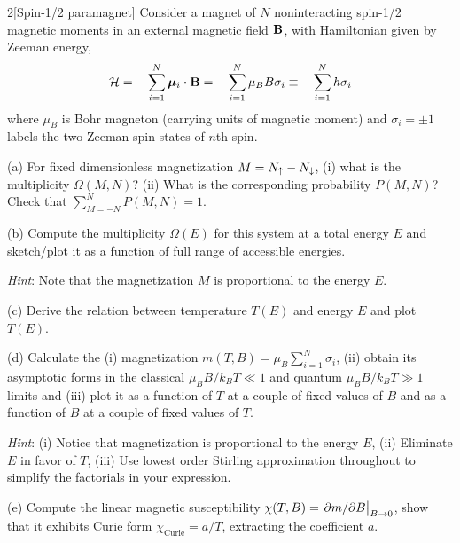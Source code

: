 \documentclass[12pt]{article}
\begin{document}
\begin{problem}{2}[Spin-1/2 paramagnet]
Consider a magnet of $N$ noninteracting spin-1/2 magnetic moments in an external
magnetic field $\vb{B}$, with Hamiltonian given by Zeeman energy,
\begin{equation}
    \HH=-\sum_{i=1}^N\bm\mu_i\vdot\vb{B}=-\sum_{i=1}^N\mu_BB\sigma_i
    \equiv-\sum_{i=1}^Nh\sigma_i
\end{equation}
where $\mu_B$ is Bohr magneton (carrying units of magnetic moment) and
$\sigma_i=\pm1$ labels the two Zeeman spin states of $n$th spin.

(a) For fixed dimensionless magnetization $M=N_\uparrow-N_\downarrow$, (i) what is the
multiplicity $\Omega(M,N)$? (ii) What is the corresponding probability $P(M,N)$?
Check that $\sum_{M=-N}^NP(M,N)=1$.

(b) Compute the multiplicity $\Omega(E)$ for this system at a total energy $E$
and sketch/plot it as a function of full range of accessible energies. 

\textit{Hint}: Note that the magnetization $M$ is proportional to the energy
$E$.

(c) Derive the relation between temperature $T(E)$ and energy $E$ and plot
$T(E)$.

(d) Calculate the (i) magnetization $m(T,B)=\mu_B\sum_{i=1}^N\sigma_i$, (ii)
obtain its asymptotic forms in the classical $\mu_BB/k_BT\ll 1$ and quantum
$\mu_BB/k_BT\gg 1$ limits and (iii) plot it as a function of $T$ at a couple of
fixed values of $B$ and as a function of $B$ at a couple of fixed values of $T$.

\textit{Hint}: (i) Notice that magnetization is proportional to the energy $E$,
(ii) Eliminate $E$ in favor of $T$, (iii) Use lowest order Stirling
approximation throughout to simplify the factorials in your expression.

(e) Compute the linear magnetic susceptibility $\chi(T,B)=\eval{\partial
m/\partial B}_{B\to0}$, show that it exhibits Curie form
$\chi_\text{Curie}=a/T$, extracting the coefficient $a$.


\end{problem}
\end{document}

